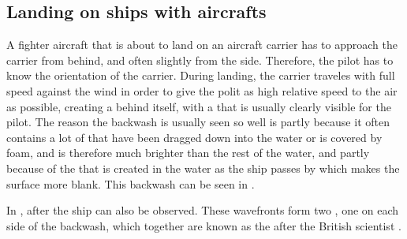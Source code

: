 \subsection{Landing on ships with aircrafts}

A fighter aircraft that is about to land on an aircraft carrier has to approach the carrier from behind, and often slightly from the side. Therefore, the pilot has to know the orientation of the carrier. During landing, the carrier traveles with full speed against the wind in order to give the polit as high relative speed to the air as possible, creating a \wake behind itself, with a \backwash that is usually clearly visible for the pilot. The reason the backwash is usually seen so well is partly because it often contains a lot of  that have been dragged down into the water or is covered by foam, and is therefore much brighter than the rest of the water, and partly because of the \turbulence that is created in the water as the ship passes by which makes the surface more blank. This backwash can be seen in .

In ,  after the ship can also be observed. These wavefronts form two , one on each side of the backwash, which together are known as the  after the British scientist .

